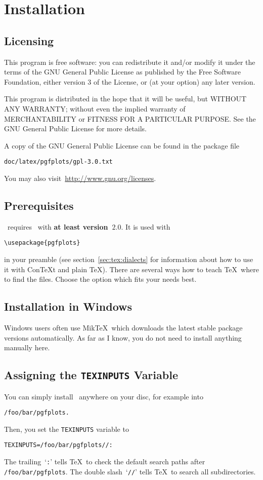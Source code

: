 
\section{Installation}
\subsection{Licensing}
This program is free software: you can redistribute it and/or modify
it under the terms of the GNU General Public License as published by
the Free Software Foundation, either version 3 of the License, or
(at your option) any later version.

This program is distributed in the hope that it will be useful,
but WITHOUT ANY WARRANTY; without even the implied warranty of
MERCHANTABILITY or FITNESS FOR A PARTICULAR PURPOSE.  See the
GNU General Public License for more details.

A copy of the GNU General Public License can be found in the package file
\begin{lstlisting}
doc/latex/pgfplots/gpl-3.0.txt
\end{lstlisting}
You may also visit~\url{http://www.gnu.org/licenses}.

\subsection{Prerequisites}
\PGFPlots\ requires \PGF\ with \textbf{at least version~$2.0$}. It is used with
\begin{lstlisting}
\usepackage{pgfplots}
\end{lstlisting}
in your preamble (see section~\ref{sec:tex:dialects} for information about how to use it with Con{\TeX}t and plain \TeX). There are several ways how to teach \TeX\ where to find the files. Choose the option which fits your needs best.

\subsection{Installation in Windows}
Windows users often use Mik\TeX\ which downloads the latest stable package versions automatically. As far as I know, you do not need to install anything manually here.

\subsection{Assigning the \texttt{TEXINPUTS} Variable}
You can simply install \PGFPlots\ anywhere on your disc, for example into
\begin{lstlisting}
/foo/bar/pgfplots.
\end{lstlisting}
Then, you set the \texttt{TEXINPUTS} variable to
\begin{lstlisting}
TEXINPUTS=/foo/bar/pgfplots//:
\end{lstlisting}
The trailing~`\texttt{:}' tells \TeX\ to check the default search paths after \lstinline!/foo/bar/pgfplots!. The double slash~`\texttt{//}' tells \TeX\ to search all subdirectories.

